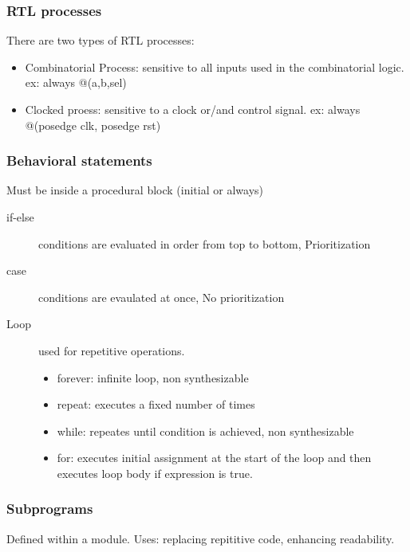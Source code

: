 \subsubsection{RTL processes}
There are two types of RTL processes:
\begin{itemize}
    \item Combinatorial Process: sensitive to all inputs used in the combinatorial logic. ex: always @(a,b,sel)
    \item Clocked proess: sensitive to a clock or/and control signal. ex: always @(posedge clk, posedge rst)
\end{itemize}

\subsubsection{Behavioral statements}

Must be inside a procedural block (initial or always)

\begin{description}
\item[if-else] conditions are evaluated in order from top to bottom, Prioritization
\item[case] conditions are evaulated at once, No prioritization
\item[Loop] used for repetitive operations.
\begin{itemize}
    \item forever: infinite loop, non synthesizable
    \item repeat: executes a fixed number of times
    \item while: repeates until condition is achieved, non synthesizable
    \item for: executes initial assignment at the start of the loop and then executes loop body if expression is true.
\end{itemize}

\end{description}


\subsubsection{Subprograms}
Defined within a module. Uses: replacing repititive code, enhancing readability.

